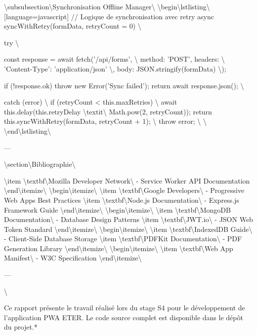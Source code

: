 \documentclass[12pt,a4paper]{report}
\begin{document}
\textbackslash{}subsubsection\textbackslash{}{Synchronisation Offline Manager\textbackslash{}}
\textbackslash{}begin\textbackslash{}{lstlisting\textbackslash{}}[language=javascript]
// Logique de synchronisation avec retry
async syncWithRetry(formData, retryCount = 0) \textbackslash{}{
    try \textbackslash{}{
        const response = await fetch('/api/forms', \textbackslash{}{
            method: 'POST',
            headers: \textbackslash{}{ 'Content-Type': 'application/json' \textbackslash{}},
            body: JSON.stringify(formData)
        \textbackslash{}});
        
        if (!response.ok) throw new Error('Sync failed');
        return await response.json();
    \textbackslash{}} catch (error) \textbackslash{}{
        if (retryCount < this.maxRetries) \textbackslash{}{
            await this.delay(this.retryDelay \textbackslash{}textit\textbackslash{}{ Math.pow(2, retryCount));
            return this.syncWithRetry(formData, retryCount + 1);
        \textbackslash{}}
        throw error;
    \textbackslash{}}
\textbackslash{}}
\textbackslash{}end\textbackslash{}{lstlisting\textbackslash{}}

---

\textbackslash{}section\textbackslash{}{Bibliographie\textbackslash{}}

\textbackslash{}item \textbackslash{}textbf\textbackslash{}{Mozilla Developer Network\textbackslash{}} - Service Worker API Documentation
\textbackslash{}end\textbackslash{}{itemize\textbackslash{}}
\textbackslash{}begin\textbackslash{}{itemize\textbackslash{}}
\textbackslash{}item \textbackslash{}textbf\textbackslash{}{Google Developers\textbackslash{}} - Progressive Web Apps Best Practices
\textbackslash{}item \textbackslash{}textbf\textbackslash{}{Node.js Documentation\textbackslash{}} - Express.js Framework Guide
\textbackslash{}end\textbackslash{}{itemize\textbackslash{}}
\textbackslash{}begin\textbackslash{}{itemize\textbackslash{}}
\textbackslash{}item \textbackslash{}textbf\textbackslash{}{MongoDB Documentation\textbackslash{}} - Database Design Patterns
\textbackslash{}item \textbackslash{}textbf\textbackslash{}{JWT.io\textbackslash{}} - JSON Web Token Standard
\textbackslash{}end\textbackslash{}{itemize\textbackslash{}}
\textbackslash{}begin\textbackslash{}{itemize\textbackslash{}}
\textbackslash{}item \textbackslash{}textbf\textbackslash{}{IndexedDB Guide\textbackslash{}} - Client-Side Database Storage
\textbackslash{}item \textbackslash{}textbf\textbackslash{}{PDFKit Documentation\textbackslash{}} - PDF Generation Library
\textbackslash{}end\textbackslash{}{itemize\textbackslash{}}
\textbackslash{}begin\textbackslash{}{itemize\textbackslash{}}
\textbackslash{}item \textbackslash{}textbf\textbackslash{}{Web App Manifest\textbackslash{}} - W3C Specification
\textbackslash{}end\textbackslash{}{itemize\textbackslash{}}

---

\textbackslash{}}Ce rapport présente le travail réalisé lors du stage S4 pour le développement de l'application PWA ETER. Le code source complet est disponible dans le dépôt du projet.*
\end{document}
